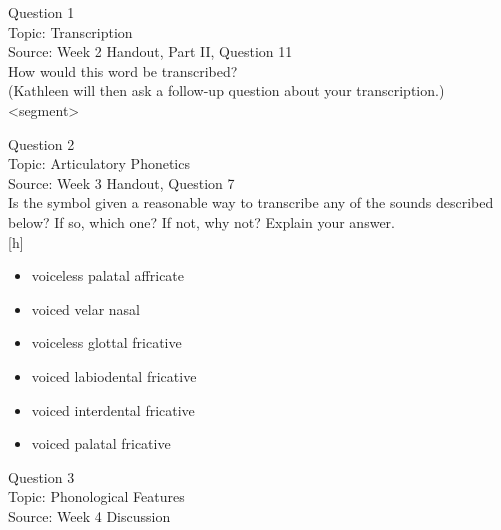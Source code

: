 \documentclass[12pt]{article}
\begin{document}
\begin{center}
\textbf{{\color{blue}{\HUGE START OF EXAM\\}}}

\textbf{{\color{blue}{\HUGE Student ID: 96220\\}}}

\textbf{{\color{blue}{\HUGE \\}}}

\end{center}
\newpage

{\large Question 1}\\

Topic: Transcription\\
Source: Week 2 Handout, Part II, Question 11\\

How would this word be transcribed?\\ (Kathleen will then ask a follow-up question about your transcription.)\\

<segment>


\newpage

{\large Question 2}\\

Topic: Articulatory Phonetics\\
Source: Week 3 Handout, Question 7\\

Is the symbol given a reasonable way to transcribe any of the sounds described below? If so, which one? If not, why not? Explain your answer.\\

{[h]}

\begin{itemize} \item voiceless palatal affricate \item voiced velar nasal \item voiceless glottal fricative \item voiced labiodental fricative \item voiced interdental fricative \item voiced palatal fricative \end{itemize}


\newpage

{\large Question 3}\\

Topic: Phonological Features\\
Source: Week 4 Discussion\\
\end{document}

